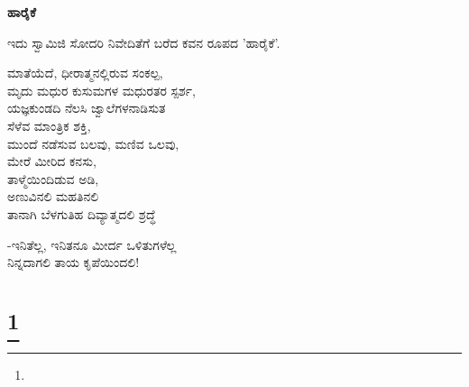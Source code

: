 \selectkan

\begin{center}
\textbf{ಹಾರೈಕೆ}
\end{center}

\begin{center}
ಇದು ಸ್ವಾಮಿಜಿ ಸೋದರಿ ನಿವೇದಿತೆಗೆ ಬರೆದ ಕವನ ರೂಪದ 'ಹಾರೈಕೆ'.
\end{center}

\begin{myquote}
ಮಾತೆಯೆದೆ, ಧೀರಾತ್ಮನಲ್ಲಿರುವ ಸಂಕಲ್ಪ,\\ಮೃದು ಮಧುರ ಕುಸುಮಗಳ ಮಧುರತರ ಸ್ಪರ್ಶ,\\ಯಜ್ಞಕುಂಡದಿ ನೆಲಸಿ ಜ್ವಾಲೆಗಳನಾಡಿಸುತ\\ಸೆಳೆವ ಮಾಂತ್ರಿಕ ಶಕ್ತಿ,\\ಮುಂದೆ ನಡೆಸುವ ಬಲವು, ಮಣಿವ ಒಲವು,\\ಮೇರೆ ಮೀರಿದ ಕನಸು,\\ತಾಳ್ಮೆಯಿಂದಿಡುವ ಅಡಿ,\\ಅಣುವಿನಲಿ ಮಹತಿನಲಿ\\ತಾನಾಗಿ ಬೆಳಗುತಿಹ ದಿವ್ಯಾತ್ಮದಲಿ ಶ್ರದ್ಧೆ
\end{myquote}

\begin{myquote}
-ಇನಿತೆಲ್ಲ, ಇನಿತನೂ ಮೀರ್ದ ಒಳಿತುಗಳೆಲ್ಲ\\ನಿನ್ನದಾಗಲಿ ತಾಯ ಕೃಪೆಯಿಂದಲಿ!
\end{myquote}

\selecteng

\chapter[REQUIESCAT IN PACE]{\protect\footnote{}}

\begin{myquote}
\end{myquote}

\begin{myquote}
\end{myquote}

